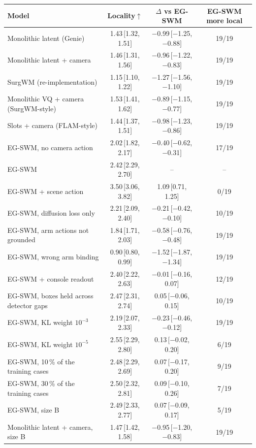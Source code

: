 \begin{tabular}{lccc}
\toprule
Model & Locality$\uparrow$ & $\Delta$ vs EG-SWM & EG-SWM more local \\
\midrule
Monolithic latent (Genie) & 1.43\,{\scriptsize[1.32, 1.51]} & $-$0.99\,{\scriptsize[$-$1.25, $-$0.88]} & 19/19 \\
Monolithic latent + camera & 1.46\,{\scriptsize[1.31, 1.56]} & $-$0.96\,{\scriptsize[$-$1.22, $-$0.83]} & 19/19 \\
SurgWM (re-implementation) & 1.15\,{\scriptsize[1.10, 1.22]} & $-$1.27\,{\scriptsize[$-$1.56, $-$1.10]} & 19/19 \\
Monolithic VQ + camera (SurgWM-style) & 1.53\,{\scriptsize[1.41, 1.62]} & $-$0.89\,{\scriptsize[$-$1.15, $-$0.77]} & 19/19 \\
Slots + camera (FLAM-style) & 1.44\,{\scriptsize[1.37, 1.51]} & $-$0.98\,{\scriptsize[$-$1.23, $-$0.86]} & 19/19 \\
EG-SWM, no camera action & 2.02\,{\scriptsize[1.82, 2.17]} & $-$0.40\,{\scriptsize[$-$0.62, $-$0.31]} & 17/19 \\
EG-SWM & 2.42\,{\scriptsize[2.29, 2.70]} & -- & -- \\
EG-SWM + scene action & 3.50\,{\scriptsize[3.06, 3.82]} & 1.09\,{\scriptsize[0.71, 1.25]} & 0/19 \\
EG-SWM, diffusion loss only & 2.21\,{\scriptsize[2.09, 2.40]} & $-$0.21\,{\scriptsize[$-$0.42, $-$0.10]} & 10/19 \\
EG-SWM, arm actions not grounded & 1.84\,{\scriptsize[1.71, 2.03]} & $-$0.58\,{\scriptsize[$-$0.76, $-$0.48]} & 19/19 \\
EG-SWM, wrong arm binding & 0.90\,{\scriptsize[0.80, 0.99]} & $-$1.52\,{\scriptsize[$-$1.87, $-$1.34]} & 19/19 \\
EG-SWM + console readout & 2.40\,{\scriptsize[2.22, 2.63]} & $-$0.01\,{\scriptsize[$-$0.16, 0.07]} & 12/19 \\
EG-SWM, boxes held across detector gaps & 2.47\,{\scriptsize[2.31, 2.74]} & 0.05\,{\scriptsize[$-$0.06, 0.15]} & 10/19 \\
EG-SWM, KL weight $10^{-3}$ & 2.19\,{\scriptsize[2.07, 2.33]} & $-$0.23\,{\scriptsize[$-$0.46, $-$0.12]} & 19/19 \\
EG-SWM, KL weight $10^{-5}$ & 2.55\,{\scriptsize[2.29, 2.80]} & 0.13\,{\scriptsize[$-$0.02, 0.20]} & 6/19 \\
EG-SWM, 10\,\% of the training cases & 2.48\,{\scriptsize[2.29, 2.69]} & 0.07\,{\scriptsize[$-$0.17, 0.20]} & 9/19 \\
EG-SWM, 30\,\% of the training cases & 2.50\,{\scriptsize[2.32, 2.81]} & 0.09\,{\scriptsize[$-$0.10, 0.26]} & 7/19 \\
EG-SWM, size B & 2.49\,{\scriptsize[2.33, 2.77]} & 0.07\,{\scriptsize[$-$0.09, 0.17]} & 5/19 \\
Monolithic latent + camera, size B & 1.47\,{\scriptsize[1.42, 1.58]} & $-$0.95\,{\scriptsize[$-$1.20, $-$0.83]} & 19/19 \\
\bottomrule
\end{tabular}
